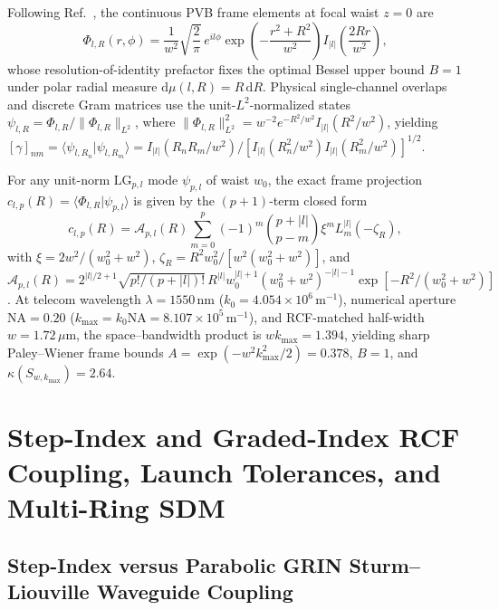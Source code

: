 \documentclass{optica-article}
\newcommand{\braket}[2]{\langle #1 | #2 \rangle}
\newcommand{\norm}[1]{\lVert #1 \rVert}
\newcommand{\abs}[1]{\lvert #1 \rvert}
\newcommand{\dd}{\mathrm{d}}
\begin{document}
Following Ref.~\cite{AyalaV15Paper1}, the continuous PVB frame elements at focal waist $z = 0$ are
\begin{equation}
  \Phi_{l,R}(r,\phi) = \frac{1}{w^2}\sqrt{\frac{2}{\pi}}\,e^{il\phi}\exp\!\left(-\frac{r^2+R^2}{w^2}\right) I_{\abs{l}}\!\left(\frac{2Rr}{w^2}\right),
  \label{eq:pvb_frame}
\end{equation}
whose resolution-of-identity prefactor fixes the optimal Bessel upper bound $B = 1$ under polar radial measure $\dd\mu(l,R) = R\,\dd R$. Physical single-channel overlaps and discrete Gram matrices use the unit-$L^2$-normalized states $\psi_{l,R} = \Phi_{l,R}/\norm{\Phi_{l,R}}_{L^2}$, where $\norm{\Phi_{l,R}}_{L^2}^2 = w^{-2} e^{-R^2/w^2} I_{\abs{l}}(R^2/w^2)$, yielding $[\gamma]_{nm} = \braket{\psi_{l,R_n}}{\psi_{l,R_m}} = I_{\abs{l}}(R_n R_m/w^2) / \allowbreak [I_{\abs{l}}(R_n^2/w^2) I_{\abs{l}}(R_m^2/w^2)]^{1/2}$.

For any unit-norm $\mathrm{LG}_{p,l}$ mode $\psi_{p,l}$ of waist $w_0$, the exact frame projection $c_{l,p}(R) = \braket{\Phi_{l,R}}{\psi_{p,l}}$ is given by the $(p+1)$-term closed form~\cite{AyalaV15Paper1}
\begin{equation}
  c_{l,p}(R) = \mathcal{A}_{p,l}(R)\sum_{m=0}^p (-1)^m \binom{p+\abs{l}}{p-m}\xi^m L_m^{\abs{l}}(-\zeta_R),
  \label{eq:c_lp}
\end{equation}
with $\xi = 2w^2/(w_0^2+w^2)$, $\zeta_R = R^2 w_0^2/[w^2(w_0^2+w^2)]$, and $\mathcal{A}_{p,l}(R) = 2^{\abs{l}/2+1}\sqrt{p!/(p+\abs{l})!}\,\allowbreak R^{\abs{l}} w_0^{\abs{l}+1}(w_0^2+w^2)^{-\abs{l}-1}\allowbreak\exp[-R^2/(w_0^2+w^2)]$. At telecom wavelength $\lambda = 1550\,\mathrm{nm}$ ($k_0 = 4.054\times 10^6\,\mathrm{m}^{-1}$), numerical aperture $\mathrm{NA} = 0.20$ ($k_{\max} = k_0\mathrm{NA} = 8.107\times 10^5\,\mathrm{m}^{-1}$), and RCF-matched half-width $w = 1.72\,\mu\mathrm{m}$, the space--bandwidth product is $w k_{\max} = 1.394$, yielding sharp Paley--Wiener frame bounds $A = \exp(-w^2 k_{\max}^2/2) = 0.378$, $B = 1$, and $\kappa(S_{w,k_{\max}}) = 2.64$.

\section{Step-Index and Graded-Index RCF Coupling, Launch Tolerances, and Multi-Ring SDM}
\label{sec:rcf_sdm}

\subsection{Step-Index versus Parabolic GRIN Sturm--Liouville Waveguide Coupling}
\end{document}
